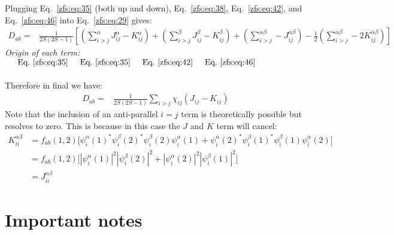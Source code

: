 Plugging Eq.~\ref{zfs:eq:35} (both up and down), Eq.~\ref{zfs:eq:38}, Eq.~\ref{zfs:eq:42}, and Eq.~\ref{zfs:eq:46} into Eq.~\ref{zfs:eq:29} gives:
\begin{align}
    D_{ab}
    =&\frac{1}{2S(2S-1)} \left[
        (\sum_{i>j}^{\alpha}J_{ij}^{\alpha} - K_{ij}^{\alpha})
        +(\sum_{i>j}^{\beta}J_{ij}^{\beta} - K_{ij}^{\beta})
        +(\sum_{i>j}^{\alpha\beta}-J_{ij}^{\alpha\beta})
        -\frac{1}{2}(\sum_{i>j}^{\alpha\beta}-2K_{ij}^{\alpha\beta})
        \right]
\end{align}
\textit{Origin of each term:} $\hspace{0.5cm}\text{Eq.~\ref{zfs:eq:35}}
\hspace{0.5cm}\text{Eq.~\ref{zfs:eq:35}}
\hspace{0.5cm}\text{Eq.~\ref{zfs:eq:42}}
\hspace{0.5cm}\text{Eq.~\ref{zfs:eq:46}}$\\
\\
Therefore in final we have:
\begin{align}
    D_{ab}
    =&\frac{1}{2S(2S-1)}
        \sum_{i>j}\chi_{ij}(J_{ij} - K_{ij})
    \label{zfs:eq:48}
\end{align}
Note that the inclusion of an anti-parallel $i=j$ term is theoretically possible but resolves to zero. This is because in this case the $J$ and $K$ term will cancel:
\begin{align}
    K_{ii}^{\alpha\beta} &= f_{ab}(1,2) \bigg[
    \psi_i^\alpha(1)^*\psi_i^\beta(2)^*\psi_i^\beta(2)\psi_i^\alpha(1)
    + \psi_i^\alpha(2)^*\psi_i^\beta(1)^*\psi_i^\beta(1)\psi_i^\alpha(2)
    \bigg]  \\
    &=f_{ab}(1,2) \bigg[
    |\psi_i^\alpha(1)|^2|\psi_i^\beta(2)|^2
    + |\psi_i^\alpha(2)|^2|\psi_i^\beta(1)|^2
    \bigg] \\
    &= J_{ii}^{\alpha\beta}
\end{align}


\section{Important notes}

